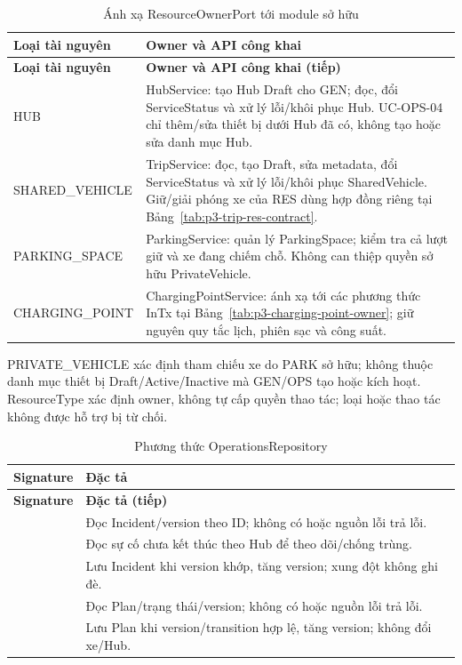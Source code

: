 \begin{longtable}{|L{37mm}|L{102mm}|}
\caption{Ánh xạ ResourceOwnerPort tới module sở hữu}\\\hline
\textbf{Loại tài nguyên} & \textbf{Owner và API công khai}\\\hline
\endfirsthead
\hline\textbf{Loại tài nguyên} & \textbf{Owner và API công khai (tiếp)}\\\hline\endhead
HUB & HubService: tạo Hub Draft cho GEN; đọc, đổi ServiceStatus và xử lý lỗi/khôi phục Hub. UC-OPS-04 chỉ thêm/sửa thiết bị dưới Hub đã có, không tạo hoặc sửa danh mục Hub.\\\hline
SHARED\_VEHICLE & TripService: đọc, tạo Draft, sửa metadata, đổi ServiceStatus và xử lý lỗi/khôi phục SharedVehicle. Giữ/giải phóng xe của RES dùng hợp đồng riêng tại Bảng~\ref{tab:p3-trip-res-contract}.\\\hline
PARKING\_SPACE & ParkingService: quản lý ParkingSpace; kiểm tra cả lượt giữ và xe đang chiếm chỗ. Không can thiệp quyền sở hữu PrivateVehicle.\\\hline
CHARGING\_POINT & ChargingPointService: ánh xạ tới các phương thức InTx tại Bảng~\ref{tab:p3-charging-point-owner}; giữ nguyên quy tắc lịch, phiên sạc và công suất.\\\hline
\end{longtable}

PRIVATE\_VEHICLE xác định tham chiếu xe do PARK sở hữu; không thuộc danh mục thiết bị Draft/Active/Inactive mà GEN/OPS tạo hoặc kích hoạt. ResourceType xác định owner, không tự cấp quyền thao tác; loại hoặc thao tác không được hỗ trợ bị từ chối.

\begin{longtable}{|L{58mm}|L{81mm}|}
\caption{Phương thức OperationsRepository}\\\hline
\textbf{Signature} & \textbf{Đặc tả}\\\hline
\endfirsthead
\hline\textbf{Signature} & \textbf{Đặc tả (tiếp)}\\\hline\endhead
{} &
Đọc Incident/version theo ID; không có hoặc nguồn lỗi trả lỗi.\\\hline
{} &
Đọc sự cố chưa kết thúc theo Hub để theo dõi/chống trùng.\\\hline
{} &
Lưu Incident khi version khớp, tăng version; xung đột không ghi đè.\\\hline
{} &
Đọc Plan/trạng thái/version; không có hoặc nguồn lỗi trả lỗi.\\\hline
{} &
Lưu Plan khi version/transition hợp lệ, tăng version; không đổi xe/Hub.\\\hline
\end{longtable}

